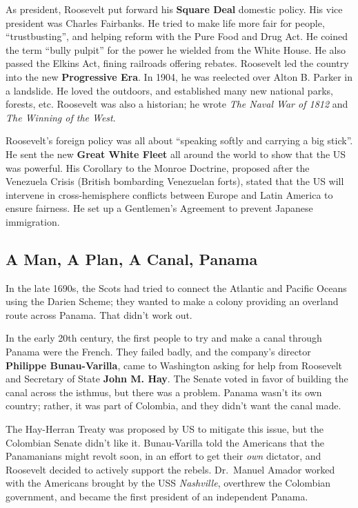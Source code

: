 As president, Roosevelt put forward his \textbf{Square Deal} domestic policy.
His vice president was Charles Fairbanks.
He tried to make life more fair for people, ``trustbusting'',
and helping reform with the Pure Food and Drug Act.
He coined the term ``bully pulpit'' for the power he wielded from the White House.
He also passed the Elkins Act, fining railroads offering rebates.
Roosevelt led the country into the new \textbf{Progressive Era}.
In 1904, he was reelected over Alton B. Parker in a landslide.
He loved the outdoors, and established many new national parks, forests, etc.
Roosevelt was also a historian; he wrote \textit{The Naval War of 1812} and \textit{The Winning of the West}.

Roosevelt's foreign policy was all about ``speaking softly and carrying a big stick''.
He sent the new \textbf{Great White Fleet} all around the world to show that the US was powerful.
His Corollary to the Monroe Doctrine, proposed after the Venezuela Crisis (British bombarding Venezuelan forts),
stated that the US will intervene in cross-hemisphere conflicts between Europe and Latin America to ensure fairness.
He set up a Gentlemen's Agreement to prevent Japanese immigration.

\subsection*{A Man, A Plan, A Canal, Panama}

In the late 1690s, the Scots had tried to connect the Atlantic and Pacific Oceans using the Darien Scheme;
they wanted to make a colony providing an overland route across Panama.
That didn't work out.

In the early 20th century, the first people to try and make a canal through Panama were the French.
They failed badly, and the company's director \textbf{Philippe Bunau-Varilla},
came to Washington asking for help from Roosevelt and Secretary of State \textbf{John M. Hay}.
The Senate voted in favor of building the canal across the isthmus, but there was a problem.
Panama wasn't its own country; rather, it was part of Colombia, and they didn't want the canal made.

The Hay-Herran Treaty was proposed by US to mitigate this issue, but the Colombian Senate didn't like it.
Bunau-Varilla told the Americans that the Panamanians might revolt soon,
in an effort to get their \textit{own} dictator,
and Roosevelt decided to actively support the rebels.
Dr.\ Manuel Amador worked with the Americans brought by the USS \textit{Nashville},
overthrew the Colombian government, and became the first president of an independent Panama.

